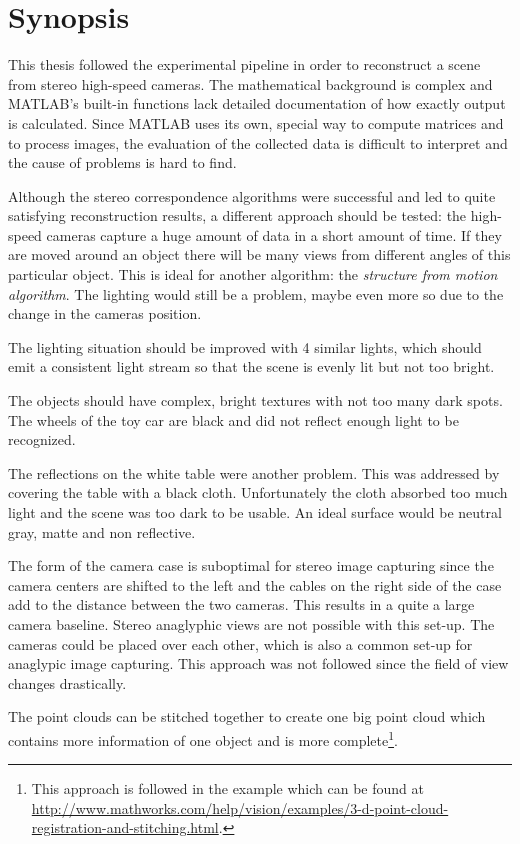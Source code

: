 \section{Synopsis}\label{c:Closure}
This thesis followed the experimental pipeline in order to reconstruct a scene from stereo high-speed cameras. The mathematical  background is complex and MATLAB's built-in functions lack detailed documentation of how exactly output is calculated. Since MATLAB uses its own, special way to compute matrices and to process images, the evaluation of the collected data is difficult to interpret and the cause of problems is hard to find. 

Although the stereo correspondence algorithms were successful and led to quite satisfying reconstruction results, a different approach should be tested: the high-speed cameras capture a huge amount of data in a short amount of time. If they are moved around an object there will be many views from different angles of this particular object. This is ideal for another algorithm: the \textit{structure from motion algorithm}. The lighting would still be a problem, maybe even more so due to the change in the cameras position.

The lighting situation should be improved with 4 similar lights, which should emit a consistent light stream so that the scene is evenly lit but not too bright.

The objects should have complex, bright textures with not too many dark spots. The wheels of the toy car are black and did not reflect enough light to be recognized.

The reflections on the white table were another problem. This was addressed by covering the table with a black cloth. Unfortunately the cloth absorbed too much light and the scene was too dark to be usable. An ideal surface would be neutral gray, matte and non reflective.


The form of the camera case is suboptimal for stereo image capturing since the camera centers are shifted to the left and the cables on the right side of the case add to the distance between the two cameras. This results in a quite a large camera baseline. Stereo anaglyphic views are not possible with this set-up. The cameras could be placed over each other, which is also a common set-up for anaglypic image capturing. This approach was not followed since the field of view changes drastically.

The point clouds can be stitched together to create one big point cloud which contains more information of one object and is more complete\footnote{This approach is followed in the example which can be found at \url{http://www.mathworks.com/help/vision/examples/3-d-point-cloud-registration-and-stitching.html}.}.

